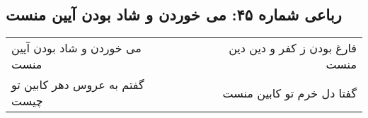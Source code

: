 \begin{center}
\section*{رباعی شماره ۴۵: می خوردن و شاد بودن آیین منست}
\label{sec:sh045}
\begin{longtable}{l p{0.5cm} r}
می خوردن و شاد بودن آیین منست
&&
فارغ بودن ز کفر و دین دین منست
\\
گفتم به عروس دهر کابین تو چیست
&&
گفتا دل خرم تو کابین منست
\\
\end{longtable}
\end{center}

